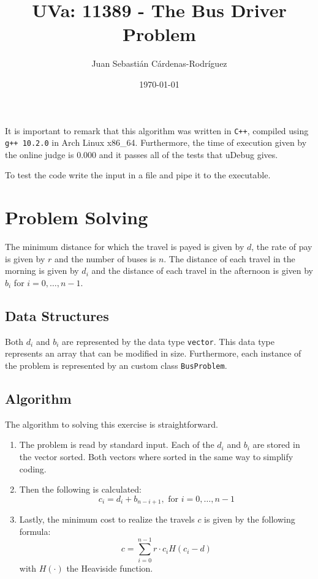 \documentclass[11pt]{article}
\title{UVa: 11389 - The Bus Driver Problem}
\author{Juan Sebasti\'an C\'ardenas-Rodríguez \\
  \scalebox{0.7}{Mathematical Engineering, Universidad EAFIT}}
\date{\today}
\theoremstyle{definition}
\theoremstyle{remark}
\theoremstyle{remark}
\begin{document}
\maketitle

It is important to remark that this algorithm was written in \texttt{C++},
compiled using \texttt{g++ 10.2.0} in Arch Linux x86\_64. Furthermore, the time
of execution given by the online judge is 0.000 and it passes all of the tests
that uDebug gives.

To test the code write the input in a file and pipe it to the executable.

\section{Problem Solving}

The minimum distance for which the travel is payed is given by $d$, the rate of
pay is given by $r$ and the number of buses is $n$. The distance of each travel
in the morning is given by $d_{i}$ and the distance of each travel in the
afternoon is given by $b_{i}$ for $i = 0,\ldots, n-1$.

\subsection{Data Structures}

Both $d_{i}$ and $b_{i}$ are represented by the data type \texttt{vector}. This
data type represents an array that can be modified in size. Furthermore, each
instance of the problem is represented by an custom class \texttt{BusProblem}.

\subsection{Algorithm}
The algorithm to solving this exercise is straightforward.
\begin{enumerate}
  \item The problem is read by standard input. Each of the $d_{i}$ and $b_{i}$
        are stored in the vector sorted. Both vectors where sorted in the same
        way to simplify coding.
  \item Then the following is calculated:
        \begin{equation*}
          c_i = d_i + b_{n - i + 1}, \text{ for } i=0,\ldots, n-1
        \end{equation*}
  \item Lastly, the minimum cost to realize the travels $c$ is given by the
        following formula:
        \begin{equation*}
          c = \sum_{i=0}^{n-1} r\cdot c_i H(c_i - d)
        \end{equation*}
        with $H(\cdot)$ the Heaviside function.
\end{enumerate}
\end{document}
